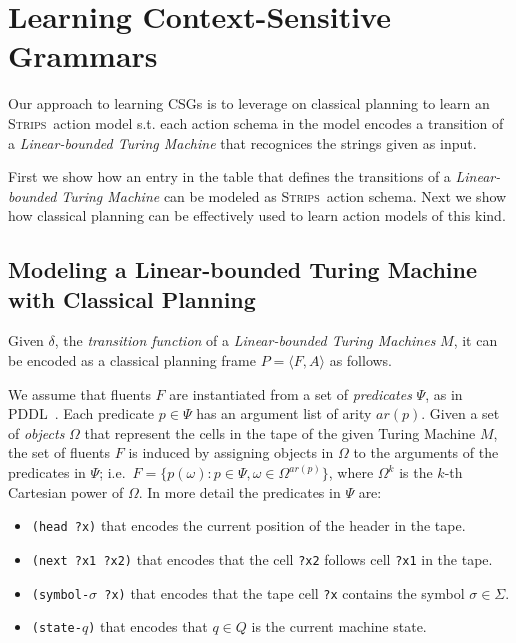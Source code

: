 \documentclass[letterpaper]{article} %
\newcommand{\tup}[1]{{\langle #1 \rangle}}
\newcommand{\strips}{\textsc{Strips}}     %
\begin{document}
\section{Learning Context-Sensitive Grammars}

Our approach to learning CSGs is to leverage on classical planning to learn an \strips\ action model s.t. each action schema in the model encodes a transition of a {\em Linear-bounded Turing Machine} that recognices the strings given as input.

First we show how an entry in the table that defines the transitions of a {\em Linear-bounded Turing Machine} can be modeled as \strips\ action schema. Next we show how classical planning can be effectively used to learn action models of this kind.

\subsection{Modeling a Linear-bounded Turing Machine with Classical Planning}
Given $\delta$, the {\em transition function} of a {\em Linear-bounded Turing Machines} $M$, it can be encoded as a classical planning frame $P=\tup{F,A}$ as follows.

We assume that fluents $F$ are instantiated from a set of {\em predicates} $\Psi$, as in PDDL~\cite{fox2003pddl2}. Each predicate $p\in\Psi$ has an argument list of arity $ar(p)$. Given a set of {\em objects} $\Omega$ that represent the cells in the tape of the given Turing Machine $M$, the set of fluents $F$ is induced by assigning objects in $\Omega$ to the arguments of the predicates in $\Psi$; i.e.~$F=\{p(\omega):p\in\Psi,\omega\in\Omega^{ar(p)}\}$, where $\Omega^k$ is the $k$-th Cartesian power of $\Omega$. In more detail the predicates in $\Psi$ are:
\begin{itemize}
\item {\tt (head ?x)} that encodes the current position of the header in the tape.
\item {\tt (next ?x1 ?x2)} that encodes that the cell {\tt ?x2} follows cell {\tt ?x1} in the tape.
\item {\tt (symbol-$\sigma$ ?x)} that encodes that the tape cell {\tt ?x} contains the symbol $\sigma\in\Sigma$.
\item {\tt (state-$q$)} that encodes that $q\in Q$ is the current machine state.
\end{itemize}
\end{document}
